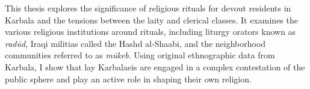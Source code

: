 This thesis explores the significance of religious rituals for devout residents in Karbala and the tensions between the laity and clerical classes. It examines the various religious institutions around rituals, including liturgy orators known as \emph{radūd}, Iraqi militias called the Hashd al-Shaabi, and the neighborhood communities referred to as \emph{mūkeb}. Using original ethnographic data from Karbala, I show that lay Karbalaeis are engaged in a complex contestation of the public sphere and play an active role in shaping their own religion. 

